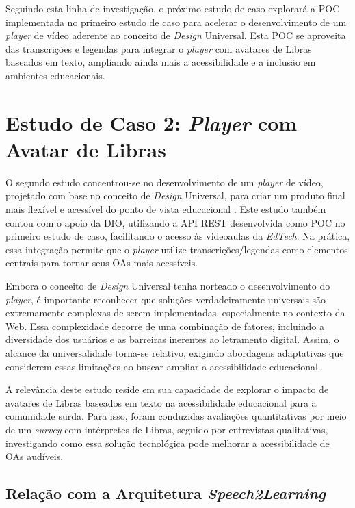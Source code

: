 Seguindo esta linha de investigação, o próximo estudo de caso explorará a POC implementada no primeiro estudo de caso para acelerar o desenvolvimento de um \textit{player} de vídeo aderente ao conceito de \textit{Design} Universal. Esta POC se aproveita das transcrições e legendas para integrar o \textit{player} com avatares de Libras baseados em texto, ampliando ainda mais a acessibilidade e a inclusão em ambientes educacionais.

\section{Estudo de Caso 2: \textit{Player} com Avatar de Libras}
\label{c4:cs2}

O segundo estudo concentrou-se no desenvolvimento de um \textit{player} de vídeo, projetado com base no conceito de \textit{Design} Universal, para criar um produto final mais flexível e acessível do ponto de vista educacional \cite{UNESCO2023, GovBr2023}. Este estudo também contou com o apoio da DIO, utilizando a API REST desenvolvida como POC no primeiro estudo de caso, facilitando o acesso às videoaulas da \textit{EdTech}. Na prática, essa integração permite que o \textit{player} utilize transcrições/legendas como elementos centrais para tornar seus OAs mais acessíveis.

Embora o conceito de \textit{Design} Universal tenha norteado o desenvolvimento do \textit{player}, é importante reconhecer que soluções verdadeiramente universais são extremamente complexas de serem implementadas, especialmente no contexto da Web. Essa complexidade decorre de uma combinação de fatores, incluindo a diversidade dos usuários e as barreiras inerentes ao letramento digital. Assim, o alcance da universalidade torna-se relativo, exigindo abordagens adaptativas que considerem essas limitações ao buscar ampliar a acessibilidade educacional.

A relevância deste estudo reside em sua capacidade de explorar o impacto de avatares de Libras baseados em texto na acessibilidade educacional para a comunidade surda. Para isso, foram conduzidas avaliações quantitativas por meio de um \textit{survey} com intérpretes de Libras, seguido por entrevistas qualitativas, investigando como essa solução tecnológica pode melhorar a acessibilidade de OAs audíveis.

\subsection{Relação com a Arquitetura \textit{Speech2Learning}}

